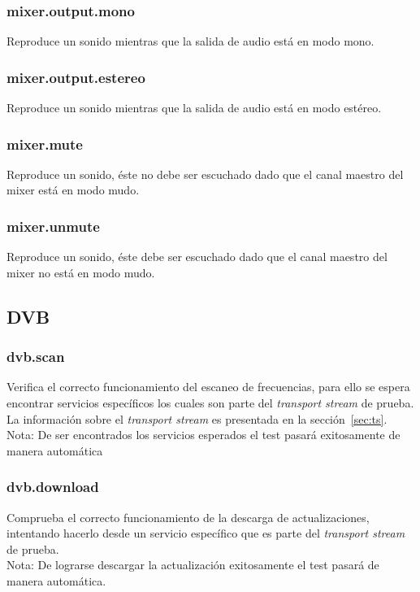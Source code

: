 \documentclass{article}
\begin{document}
\FloatBarrier

\subsubsection{mixer.output.mono}
Reproduce un sonido mientras que la salida de audio está en modo mono.

\FloatBarrier

\subsubsection{mixer.output.estereo}
Reproduce un sonido mientras que la salida de audio está en modo estéreo.

\FloatBarrier

\subsubsection{mixer.mute}
Reproduce un sonido, éste no debe ser escuchado dado que el canal maestro del mixer está en modo mudo.

\FloatBarrier

\subsubsection{mixer.unmute}
Reproduce un sonido, éste debe ser escuchado dado que el canal maestro del mixer no está en modo mudo.

\FloatBarrier

\subsection{DVB}
\label{sec:dvb_test}

\FloatBarrier

\subsubsection{dvb.scan}
Verifica el correcto funcionamiento del escaneo de frecuencias, para ello se espera encontrar servicios específicos los cuales son parte del \textit{transport stream} de prueba. La información sobre el \textit{transport stream} es presentada en la sección~\ref{sec:ts}.\\
Nota: De ser encontrados los servicios esperados el test pasará exitosamente de manera automática

\FloatBarrier

\subsubsection{dvb.download}
Comprueba el correcto funcionamiento de la descarga de actualizaciones, intentando hacerlo desde un servicio específico que es parte del \textit{transport stream} de prueba.\\
Nota: De lograrse descargar la actualización exitosamente el test pasará de manera automática.
\end{document}
